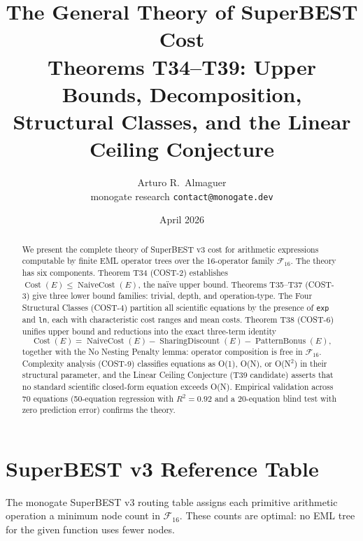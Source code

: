 \documentclass[12pt,a4paper]{article}
\title{The General Theory of SuperBEST Cost\\[6pt]
       \large Theorems T34--T39: Upper Bounds, Decomposition,\\
       Structural Classes, and the Linear Ceiling Conjecture}
\author{Arturo R.\ Almaguer\\
\small monogate research \quad \texttt{contact@monogate.dev}}
\date{April 2026}
\theoremstyle{definition}
\newcommand{\Cost}{\operatorname{Cost}}
\newcommand{\NC}{\operatorname{NaiveCost}}
\newcommand{\SD}{\operatorname{SharingDiscount}}
\newcommand{\PB}{\operatorname{PatternBonus}}
\begin{document}
\maketitle

\begin{abstract}
We present the complete theory of SuperBEST v3 cost for arithmetic expressions
computable by finite EML operator trees over the 16-operator family
$\mathcal{F}_{16}$.
The theory has six components.
Theorem T34 (COST-2) establishes $\Cost(E) \leq \NC(E)$, the na\"{i}ve upper
bound.
Theorems T35--T37 (COST-3) give three lower bound families: trivial, depth,
and operation-type.
The Four Structural Classes (COST-4) partition all scientific equations by the
presence of \texttt{exp} and \texttt{ln}, each with characteristic cost ranges
and mean costs.
Theorem T38 (COST-6) unifies upper bound and reductions into the exact
three-term identity
\[
  \Cost(E) = \NC(E) - \SD(E) - \PB(E),
\]
together with the No Nesting Penalty lemma: operator composition is free in
$\mathcal{F}_{16}$.
Complexity analysis (COST-9) classifies equations as O(1), O(N), or O(N$^2$)
in their structural parameter, and the Linear Ceiling Conjecture (T39 candidate)
asserts that no standard scientific closed-form equation exceeds O(N).
Empirical validation across 70 equations (50-equation regression with $R^2=0.92$
and a 20-equation blind test with zero prediction error) confirms the theory.
\end{abstract}

\tableofcontents
\bigskip

\section{SuperBEST v3 Reference Table}
\label{sec:superbest}

The monogate SuperBEST v3 routing table assigns each primitive arithmetic
operation a minimum node count in $\mathcal{F}_{16}$.
These counts are optimal: no EML tree for the given function uses fewer nodes.
\end{document}
